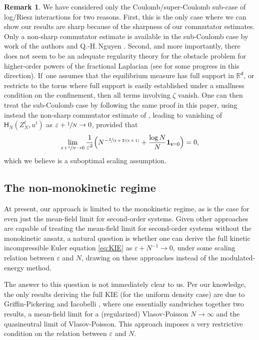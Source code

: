 \documentclass[10pt]{amsart}
\theoremstyle{plain}
\theoremstyle{definition}
\newtheorem{remark}[thm]{Remark}
\newcommand{\Bpa}[1]{\Bigl(#1\Bigr)}
\newcommand{\R}{{\mathbb{R}}}
\let\vep\varepsilon
\let\uz Z
\newcommand{\indic}{\mathbf{1}}
\newcommand{\Hr}{\mathsf{H}}
\renewcommand{\d}{\mathsf{d}}
\newcommand{\s}{\mathsf{s}}
\begin{document}
\begin{remark}\label{rem:SCrest}
We have considered only the Coulomb/super-Coulomb sub-case of log/Riesz interactions for two reasons. First, this is the only case where we can show our results are sharp because of the sharpness of our commutator estimates. Only a non-sharp commutator estimate is available in the sub-Coulomb case by work of the authors and Q.-H.\,Nguyen \cite{NRS2021}. Second, and more importantly, there does not seem to be an adequate regularity theory for the obstacle problem for higher-order powers of the fractional Laplacian (see \cite{DHP2023} for some progress in this direction). If~one assumes that the equilibrium measure has full support in $\R^\d$, or restricts to the torus where full support is easily established under a smallness condition on the confinement, then all terms involving $\zeta$ vanish. One can then treat the sub-Coulomb case by following the same proof in this paper, using instead the non-sharp commutator estimate of \cite{NRS2021}, leading to vanishing of $\Hr_{N}(\uz_N^t,u^t)$ as $\vep+\sfrac{1}{N}\to 0$, provided that\vspace*{-3pt}\enlargethispage{.5\baselineskip}
\begin{equation*}
\lim_{\vep+\sfrac{1}{N}\to 0} \frac{1}{\vep^2}\Bpa{N^{-\sfrac{2}{(\s+2)(\s+1)}}+\frac{\log N}{N}\indic_{\s=0}} =0,
\end{equation*}
which we believe is a suboptimal scaling assumption.
\end{remark}

\subsection{The non-monokinetic regime}
At present, our approach is limited to the monokinetic regime, as is the case for even just the mean-field limit for second-order systems. Given other approaches are capable of treating the mean-field limit for second-order systems without the monokinetic ansatz, a natural question is whether one can derive the full kinetic incompressible Euler equation \eqref{eq:KIE} as $\vep + N^{-1}\to 0$, under some scaling relation between $\vep$ and $N$, drawing on these approaches instead of the modulated-energy method.

The answer to this question is not immediately clear to us. Per our knowledge, the only results deriving the full KIE (for the uniform density case) are due to Griffin-Pickering and Iacobelli \cite{GpI2018, GpI2020sing}, where one essentially sandwiches together two results, a mean-field limit for a (regularized) Vlasov-Poisson $N\to\infty$ and the quasineutral limit of Vlasov-Poisson. This approach imposes a very restrictive condition on the relation between $\vep$ and $N$.
\end{document}

